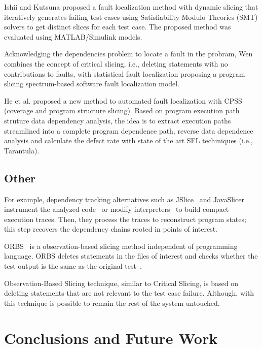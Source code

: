 \documentclass[sigplan,10pt,review,anonymous]{acmart}\settopmatter{printfolios=true,printccs=false,printacmref=false}
\begin{document}
Ishii and Kutsuna proposed a fault localization method with dynamic slicing that iteratively generates failing test cases using Satisfiability Modulo Theories (SMT) solvers to get distinct slices
for each test case. The proposed method was evaluated using MATLAB/Simulink models\cite{ishii-kutsuna-2016}.

Acknowledging the dependencies problem to locate a fault in the probram, Wen\cite{wen-2012} combines the concept of critical slicing, i.e., deleting statements with no contributions to faults,
with statistical fault localization proposing a program slicing spectrum-based software fault localization model.

He et al. proposed a new method to automated fault localization with
CPSS (coverage and program structure slicing)\cite{he-zhang-liu-gao-2014}.  Based on program
execution path struture data dependency analysis, the idea is to
extract execution paths streamlined into a complete program dependence
path, reverse data dependence analysis and calculate the defect rate
with state of the art SFL techiniques (i.e., Tarantula).

\subsection{Other}


For example,
dependency tracking alternatives such as
JSlice~\cite{Wang:2004:UCB:998675.999455} and
JavaSlicer~\cite{hammacher-bachthesis-2008} instrument the analyzed
code~\cite{hammacher-bachthesis-2008} or modify
interpreters~\cite{Wang:2004:UCB:998675.999455} to build compact
execution traces.  Then, they process the traces to reconstruct
program states; this step recovers the dependency chains rooted in
points of interest.

ORBS~\cite{Binkley:2014:OLP:2635868.2635893} is a observation-based
slicing method independent of programming language. ORBS deletes
statements in the files of interest and checks whether the test output is
the same as the original
test~\cite{Binkley:2014:OLP:2635868.2635893}.

Observation-Based Slicing technique, similar to Critical Slicing, is
based on deleting statements that are not relevant to the test case
failure. Although, with this technique is possible to remain the rest
of the system untouched.


\section{Conclusions and Future Work}\label{sec:conc}
\end{document}
